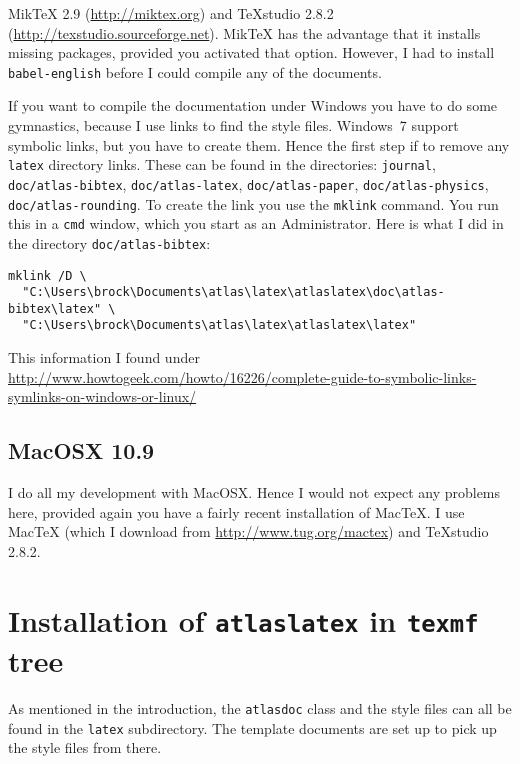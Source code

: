 \documentclass[atlasstyle,UKenglish]{latex/atlasdoc}
\newcommand{\File}[1]{\texttt{#1}\xspace}
\newcommand{\Package}[1]{\texttt{#1}\xspace}
\begin{document}
MikTeX 2.9 (\url{http://miktex.org}) and TeXstudio 2.8.2 (\url{http://texstudio.sourceforge.net}).
MikTeX has the advantage that it installs missing packages, provided you activated that option.
However, I had to install \Package{babel-english} before I could compile any of the documents.

If you want to compile the documentation under Windows you have to do some gymnastics,
because I use links to find the style files.
Windows~7 support symbolic links, but you have to create them.
Hence the first step if to remove any \texttt{latex} directory links.
These can be found in the directories: 
\File{journal}, \File{doc/atlas-bibtex}, \File{doc/atlas-latex}, \File{doc/atlas-paper}, 
\File{doc/atlas-physics}, \File{doc/atlas-rounding}.
To create the link you use the \Package{mklink} command.
You run this in a \Package{cmd} window, which you start as an Administrator.
Here is what I did in the directory \File{doc/atlas-bibtex}:
\begin{verbatim}
mklink /D \
  "C:\Users\brock\Documents\atlas\latex\atlaslatex\doc\atlas-bibtex\latex" \
  "C:\Users\brock\Documents\atlas\latex\atlaslatex\latex"
\end{verbatim}
This information I found under\\
{\footnotesize \url{http://www.howtogeek.com/howto/16226/complete-guide-to-symbolic-links-symlinks-on-windows-or-linux/}}


\subsection{MacOSX 10.9}

I do all my development with MacOSX.
Hence I would not expect any problems here, provided again you have a fairly recent
installation of Mac\TeX.
I use	MacTeX (which I download from \url{http://www.tug.org/mactex}) and TeXstudio 2.8.2.


\section{Installation of \Package{atlaslatex} in \File{texmf} tree}
\label{sec:texmf}

As mentioned in the introduction, the \texttt{atlasdoc} class and the style files can all be found in the 
\File{latex} subdirectory. The template documents are set up to pick up the style files from there.
\end{document}
